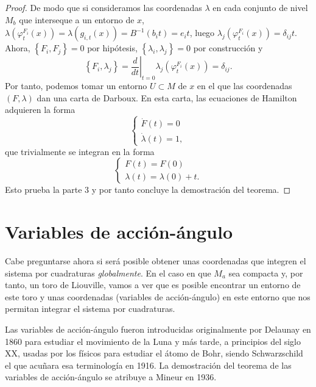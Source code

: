 \begin{proof}
De modo que si consideramos las coordenadas $\lambda$ en cada conjunto de nivel $M_b$ que interseque a un entorno de $x$,
$\lambda(\varphi^{F_i}_{t}(x))=\lambda(g_{i,t}(x))=B^{-1}(b_it)=e_it$,
luego $\lambda_j(\varphi^{F_i}_{t}(x))=\delta_{ij}t$. Ahora, $\left\{ F_i,F_j \right\}=0$ por hipótesis, $\left\{ \lambda_i,\lambda_j \right\}=0$ por construcción y 
\begin{equation*}
  \left\{ F_i,\lambda_j \right\}=\left.\frac{d}{dt}\right|_{t=0}\lambda_j(\varphi^{F_i}_t(x))=\delta_{ij}.
\end{equation*}
Por tanto, podemos tomar un entorno $U\subset M$ de $x$ en el que las coordenadas $(F,\lambda)$ dan una carta de Darboux. En esta carta, las ecuaciones de Hamilton adquieren la forma
\begin{equation*}
  \begin{cases}
    \dot{F}(t)=0 \\
    \dot{\lambda}(t)=1,
  \end{cases}
\end{equation*}
que trivialmente se integran en la forma
\begin{equation*}
  \begin{cases}
    F(t)=F(0) \\
    \lambda(t)=\lambda(0)+t.
  \end{cases}
\end{equation*}
Esto prueba la parte $3$ y por tanto concluye la demostración del teorema.
 \end{proof}

 \section{Variables de acción-ángulo}
 Cabe preguntarse ahora si será posible obtener unas coordenadas que integren el sistema por cuadraturas \emph{globalmente}. En el caso en que $M_a$ sea compacta y, por tanto, un toro de Liouville, vamos a ver que es posible encontrar un entorno de este toro y unas coordenadas (variables de acción-ángulo) en este entorno que nos permitan integrar el sistema por cuadraturas.
 
 Las variables de acción-ángulo fueron introducidas originalmente por Delaunay en 1860 para estudiar el movimiento de la Luna y más tarde, a principios del siglo XX, usadas por los físicos para estudiar el átomo de Bohr, siendo Schwarzschild el que acuñara esa terminología en 1916. La demostración del teorema de las variables de acción-ángulo se atribuye a Mineur en 1936. 

